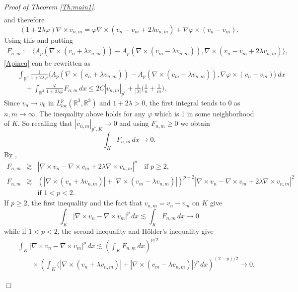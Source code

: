 \documentclass[12pt,leqno,twoside]{amsart}
\newenvironment{altproof}[1]
{\noindent%
{\em Proof of {#1}}.}
{\nopagebreak\mbox{}\hfill $\Box$\par\addvspace{0.5cm}}
\newcommand{\vp}{\varphi}
\def\R{\mathbb{R}}
\def\r{\mathbb{R}}
\def\r3{\mathbb{R}^3}
\def\vp{\varphi}
\def\curlop{\nabla\times}
\numberwithin{equation}{section}
\begin{document}
\begin{altproof}{Theorem \ref{Th:main1}}
\begin{eqnarray*}
\end{eqnarray*}
and therefore
\[
(1+2\lambda\vp)\curlop v_{n,m} = \vp\curlop(v_n-v_m+2\lambda v_{n,m}) + \nabla\vp\times(v_n-v_m).
\]
Using this and putting
\begin{eqnarray*}
F_{n,m} := \big\langle A_p(\curlop (v_n +\lambda v_{n,m})) - A_p(\curlop (v_m -\lambda v_{n,m})),
\curlop (v_n-v_m + 2\lambda v_{n,m})\big\rangle,
\end{eqnarray*}
 \eqref{Apineq} can be rewritten as
\begin{eqnarray*}
&&\int_{\R^3}\frac{1}{1+2\lambda\vp}\langle A_p(\curlop (v_n +\lambda v_{n,m})) - A_p(\curlop (v_m -\lambda v_{n,m})), \nabla\vp\times(v_n-v_m)\rangle\,dx \\
&&\quad + \int_{\R^3}\frac{\vp}{1+2\lambda\vp}F_{n,m}\,dx \le  2C|v_{n,m}|_{p^*}+\frac{1}{|\lambda|}\Big(\frac1n+\frac1m\Big).
\end{eqnarray*}
Since $v_n\to v_0$ in $L^p_{loc}(\r3,\r3)$ and $1+2\lambda>0$, the first integral tends to 0 as $n,m\to\infty$. The inequality above holds for any $\vp$ which is 1 in some neighborhood of $K$. So recalling that $|v_{n,m}|_{p^*,K}\to 0$ and using $F_{n,m}\ge 0$ 
we obtain
\[
\int_K F_{n,m}\,dx \to 0.
\] 
By \cite{Simon},
\begin{eqnarray*}
	F_{n,m} & \gtrsim & |\curlop v_n-\curlop v_m+2\lambda \curlop v_{n,m}|^p \quad \text{if } p\ge 2, \\ 
	F_{n,m} & \gtrsim & (|\curlop (v_n+\lambda v_{n,m})|+|\curlop (v_m-\lambda v_{n,m})|)^{p-2} |\curlop v_n-\curlop v_m+ 2\lambda \curlop v_{n,m}|^2\\
&& \text{if } 1<p<2. 
\end{eqnarray*}
 If $p\ge2$, the first inequality and the fact that $v_{n,m}=v_n-v_m$ on $K$ give 
 \[
 \int_{K}|\curlop v_n-\curlop v_m|^p\,dx
 \lesssim\int_{K}F_{n,m}\,dx
 \longrightarrow0
 \]
 while if $1<p<2$, the second inequality and H\"older's inequality
 give
 \begin{eqnarray*}
 	&&\int_{K}|\curlop v_n-\curlop v_m|^p\,dx \lesssim\left(\int_{K}F_{n,m}\,dx\right)^{p/2}
 	\\
 	&&\qquad{}\times
 	\left(
 	\int_{K}
 	\big(|\curlop(v_n+\lambda v_{n,m})|
 	+|\curlop(v_m-\lambda v_{n,m})|\big)^p\,dx
 	\right)^{(2-p)/2}
 	\longrightarrow0.
 \end{eqnarray*}
 

\end{altproof}
\end{document}
